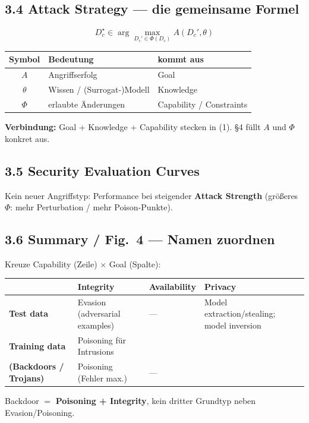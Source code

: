 \documentclass[10pt,a4paper]{article}
\begin{document}
\subsection{3.4 Attack Strategy --- die gemeinsame Formel}
\[
D_c^\star \in \arg\max_{D_c'\in\Phi(D_c)} A(D_c',\theta)
\tag{1}
\]
\begin{tabularx}{\textwidth}{@{}>{\bfseries\small}c >{\small}X >{\small}X@{}}
\toprule
Symbol & Bedeutung & kommt aus \\
\midrule
$A$ & Angriffserfolg & Goal \\
$\theta$ & Wissen / (Surrogat-)Modell & Knowledge \\
$\Phi$ & erlaubte \"Anderungen & Capability / Constraints \\
\bottomrule
\end{tabularx}
\vspace{0.1em}
{\small\textbf{Verbindung:} Goal + Knowledge + Capability stecken in (1). §4 f\"ullt $A$ und $\Phi$ konkret aus.}

\subsection{3.5 Security Evaluation Curves}
Kein neuer Angriffstyp: Performance bei steigender \textbf{Attack Strength}
(gr\"o\ss{}eres $\Phi$: mehr Perturbation / mehr Poison-Punkte).

\subsection{3.6 Summary / Fig.\ 4 --- Namen zuordnen}
Kreuze Capability (Zeile) $\times$ Goal (Spalte):

\begin{tabularx}{\textwidth}{@{}>{\small\bfseries}l >{\small}X >{\small}X >{\small}X@{}}
\toprule
 & Integrity & Availability & Privacy \\
\midrule
Test data & Evasion (adversarial examples) & --- &
  Model extraction/stealing; model inversion \\
Training data & Poisoning f\"ur Intrusions\\(Backdoors / Trojans) &
  Poisoning (Fehler max.) & --- \\
\bottomrule
\end{tabularx}
\vspace{0.1em}
{\small Backdoor $=$ \textbf{Poisoning + Integrity}, kein dritter Grundtyp neben Evasion/Poisoning.}

\end{document}
